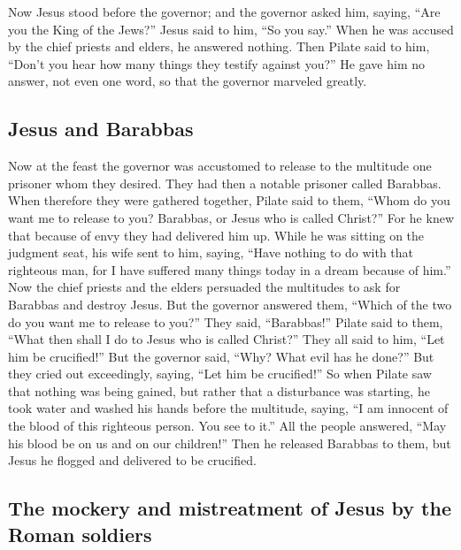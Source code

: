  Now Jesus stood before the governor; and the governor
asked him, saying, ``Are you the King of the Jews?'' Jesus said to him,
``So you say.''  When he was accused by the chief priests
and elders, he answered nothing.  Then Pilate said to
him, ``Don't you hear how many things they testify against you?''
 He gave him no answer, not even one word, so that the
governor marveled greatly.

\hypertarget{jesus-and-barabbas}{%
\subsection{Jesus and Barabbas}\label{jesus-and-barabbas}}

 Now at the feast the governor was accustomed to release
to the multitude one prisoner whom they desired.  They
had then a notable prisoner called Barabbas.  When
therefore they were gathered together, Pilate said to them, ``Whom do
you want me to release to you? Barabbas, or Jesus who is called
Christ?''  For he knew that because of envy they had
delivered him up.  While he was sitting on the judgment
seat, his wife sent to him, saying, ``Have nothing to do with that
righteous man, for I have suffered many things today in a dream because
of him.''  Now the chief priests and the elders persuaded
the multitudes to ask for Barabbas and destroy Jesus. 
But the governor answered them, ``Which of the two do you want me to
release to you?'' They said, ``Barabbas!''  Pilate said
to them, ``What then shall I do to Jesus who is called Christ?'' They
all said to him, ``Let him be crucified!''  But the
governor said, ``Why? What evil has he done?'' But they cried out
exceedingly, saying, ``Let him be crucified!''  So when
Pilate saw that nothing was being gained, but rather that a disturbance
was starting, he took water and washed his hands before the multitude,
saying, ``I am innocent of the blood of this righteous person. You see
to it.''  All the people answered, ``May his blood be on
us and on our children!''  Then he released Barabbas to
them, but Jesus he flogged and delivered to be crucified.

\hypertarget{the-mockery-and-mistreatment-of-jesus-by-the-roman-soldiers}{%
\subsection{The mockery and mistreatment of Jesus by the Roman
soldiers}\label{the-mockery-and-mistreatment-of-jesus-by-the-roman-soldiers}}

